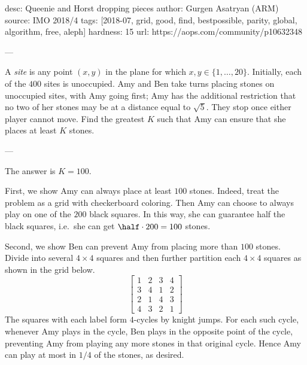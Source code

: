 desc: Queenie and Horst dropping pieces
author: Gurgen Asatryan (ARM)
source: IMO 2018/4
tags: [2018-07, grid, good, find, bestpossible, parity, global, algorithm, free, aleph]
hardness: 15
url: https://aops.com/community/p10632348

---

A \emph{site} is any point $(x,y)$ in the plane
for which $x,y \in \{1, \dots, 20\}$.
Initially, each of the $400$ sites is unoccupied.
Amy and Ben take turns placing stones on unoccupied sites,
with Amy going first;
Amy has the additional restriction that no two of her stones
may be at a distance equal to $\sqrt5$.
They stop once either player cannot move.
Find the greatest $K$ such that Amy can ensure that
she places at least $K$ stones.

---

The answer is $K = 100$.

First, we show Amy can always place at least $100$ stones.
Indeed, treat the problem as a grid with checkerboard coloring.
Then Amy can choose to always play on one of the $200$ black squares.
In this way, she can guarantee half the black squares,
i.e.\ she can get $\half \cdot 200 = 100$ stones.

Second, we show Ben can prevent Amy from placing more than $100$ stones.
Divide into several $4 \times 4$ squares and then further partition
each $4 \times 4$ squares as shown in the grid below.
\[
  \left[
  \begin{array}{cccc}
    1 & 2 & 3 & 4 \\
    3 & 4 & 1 & 2 \\
    2 & 1 & 4 & 3 \\
    4 & 3 & 2 & 1
  \end{array}
  \right]
\]
The squares with each label form $4$-cycles by knight jumps.
For each such cycle, whenever Amy plays in the cycle,
Ben plays in the opposite point of the cycle,
preventing Amy from playing any more stones in that original cycle.
Hence Amy can play at most in $1/4$ of the stones, as desired.
